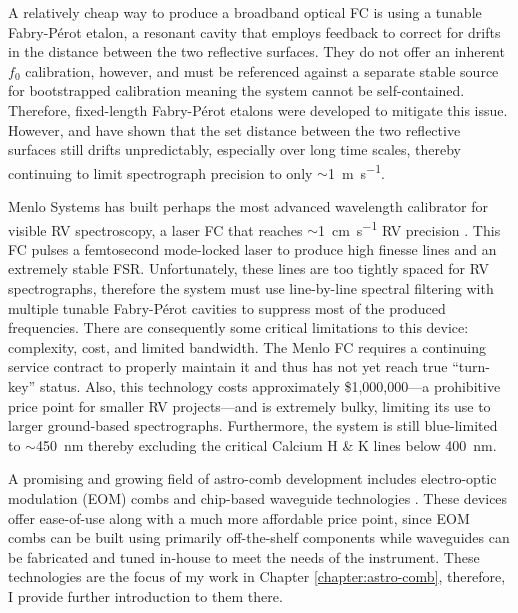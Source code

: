 A relatively cheap way to produce a broadband optical FC is using a tunable Fabry-P\'erot etalon, a resonant cavity that employs feedback to correct for drifts in the distance between the two reflective surfaces. They do not offer an inherent $f_0$ calibration, however, and must be referenced against a separate stable source for bootstrapped calibration \citep{mccracken_single-lock_2014, sturmer_rubidium-traced_2017} meaning the system cannot be self-contained. Therefore, fixed-length Fabry-P\'erot etalons were developed to mitigate this issue. However, \citet{reiners_laser-lock_2014} and \citet{wildi_passive_2012} have shown that the set distance between the two reflective surfaces still drifts unpredictably, especially over long time scales, thereby continuing to limit spectrograph precision to only $\sim$\SI{1}{\meter\per\second}.

Menlo Systems has built perhaps the most advanced wavelength calibrator for visible RV spectroscopy, a laser FC that reaches $\sim$\SI{1}{\centi\meter\per\second} RV precision \citep{probst_laser_2014}. This FC pulses a femtosecond mode-locked laser to produce high finesse lines and an extremely stable FSR. Unfortunately, these lines are too tightly spaced for RV spectrographs, therefore the system must use line-by-line spectral filtering with multiple tunable Fabry-P\'erot cavities to suppress most of the produced frequencies. There are consequently some critical limitations to this device: complexity, cost, and limited bandwidth. The Menlo FC requires a continuing service contract to properly maintain it and thus has not yet reach true ``turn-key'' status. Also, this technology costs approximately \$1,000,000---a prohibitive price point for smaller RV projects---and is extremely bulky, limiting its use to larger ground-based spectrographs. Furthermore, the system is still blue-limited to $\sim$\SI{450}{\nano\meter} thereby excluding the critical Calcium H \& K lines below \SI{400}{\nano\meter}.

A promising and growing field of astro-comb development includes electro-optic modulation (EOM) combs and chip-based waveguide technologies \citep[e.g.][]{carlson_ultrafast_2017}. These devices offer ease-of-use along with a much more affordable price point, since EOM combs can be built using primarily off-the-shelf components while waveguides can be fabricated and tuned in-house to meet the needs of the instrument. These technologies are the focus of my work in Chapter \ref{chapter:astro-comb}, therefore, I provide further introduction to them there.

